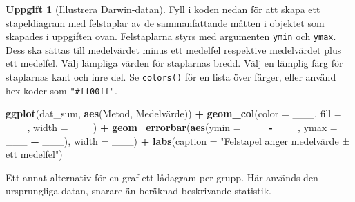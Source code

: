 \documentclass[
]{book}
\newenvironment{Shaded}{\begin{snugshade}}{\end{snugshade}}
\newcommand{\AttributeTok}[1]{\textcolor[rgb]{0.13,0.29,0.53}{#1}}
\newcommand{\FunctionTok}[1]{\textcolor[rgb]{0.13,0.29,0.53}{\textbf{#1}}}
\newcommand{\NormalTok}[1]{#1}
\newcommand{\SpecialCharTok}[1]{\textcolor[rgb]{0.81,0.36,0.00}{\textbf{#1}}}
\newcommand{\StringTok}[1]{\textcolor[rgb]{0.31,0.60,0.02}{#1}}
\theoremstyle{definition}
\theoremstyle{definition}
\theoremstyle{definition}
\newtheorem{exercise}{Uppgift}[chapter]
\theoremstyle{definition}
\theoremstyle{remark}
\begin{document}
\begin{exercise}[Illustrera Darwin-datan]

Fyll i koden nedan för att skapa ett stapeldiagram med felstaplar av de sammanfattande måtten i objektet som skapades i uppgiften ovan. Felstaplarna styrs med argumenten \texttt{ymin} och \texttt{ymax}. Dess ska sättas till medelvärdet minus ett medelfel respektive medelvärdet plus ett medelfel. Välj lämpliga värden för staplarnas bredd. Välj en lämplig färg för staplarnas kant och inre del. Se \texttt{colors()} för en lista över färger, eller använd hex-koder som \texttt{"\#ff00ff"}.

\begin{Shaded}
\begin{Highlighting}[]
\FunctionTok{ggplot}\NormalTok{(dat\_sum, }\FunctionTok{aes}\NormalTok{(Metod, Medelvärde)) }\SpecialCharTok{+}
  \FunctionTok{geom\_col}\NormalTok{(}\AttributeTok{color =}\NormalTok{ \_\_\_, }\AttributeTok{fill =}\NormalTok{ \_\_\_, }\AttributeTok{width =}\NormalTok{ \_\_\_) }\SpecialCharTok{+}
  \FunctionTok{geom\_errorbar}\NormalTok{(}\FunctionTok{aes}\NormalTok{(}\AttributeTok{ymin =}\NormalTok{ \_\_\_ }\SpecialCharTok{{-}}\NormalTok{ \_\_\_, }\AttributeTok{ymax =}\NormalTok{ \_\_\_ }\SpecialCharTok{+}\NormalTok{ \_\_\_),}
                \AttributeTok{width =}\NormalTok{ \_\_\_) }\SpecialCharTok{+}
  \FunctionTok{labs}\NormalTok{(}\AttributeTok{caption =} \StringTok{"Felstapel anger medelvärde ± ett medelfel"}\NormalTok{)}
\end{Highlighting}
\end{Shaded}

\end{exercise}

Ett annat alternativ för en graf ett lådagram per grupp. Här används den ursprungliga datan, snarare än beräknad beskrivande statistik.
\end{document}
